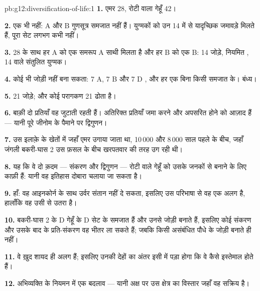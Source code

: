 \begin{solution}{pb:g12:diversification-of-life:1}
\textbf{1.} एमर 28, रोटी वाला गेहूँ 42।

\textbf{2.} एक भी नहीं: A और B गुणसूत्र समजात नहीं हैं। युग्मकों को उन 14
में से यादृच्छिक जमावड़े मिलते हैं, पूरा सेट लगभग कभी नहीं।

\textbf{3.} 28  के साथ हर A को एक समरूप A साथी मिलता है और हर B
को एक B: 14 जोड़े, नियमित , 14 वाले संतुलित युग्मक।

\textbf{4.} कोई भी जोड़ी नहीं बना सकता: 7 A, 7 B और 7 D , और हर एक
बिना किसी समजात के। बंध्य।

\textbf{5.} 21 जोड़े; और कोई परागकण 21 ढोता है।

\textbf{6.} बाक़ी दो प्रतियाँ वह  जुटाती रहती हैं। अतिरिक्त प्रतियाँ
 जमा करने और अपसरित होने को आज़ाद हैं --- यानी पूरे जीनोम के
पैमाने पर द्विगुणन।

\textbf{7.} उस इलाक़े के खेतों में जहाँ एमर उगाया जाता था, 10\,000 और
8\,000 साल पहले के बीच, जहाँ जंगली बकरी-घास 2 उस फ़सल के बीच खरपतवार की तरह
उग रही थी।

\textbf{8.} यह कि वे दो क़दम --- संकरण और द्विगुणन --- रोटी वाले गेहूँ को
उसके जनकों से बनाने के लिए काफ़ी हैं: यानी वह इतिहास दोबारा चलाया जा सकता
है।

\textbf{9.} हाँ: वह आइनकोर्न के साथ उर्वर संतान नहीं दे सकता, इसलिए उस
परिभाषा से वह एक अलग  है, हालाँकि वह उसी से उतरा है।

\textbf{10.} बकरी-घास 2 के D  गेहूँ के D सेट के समजात हैं और उनसे
जोड़ी बनाते हैं, इसलिए कोई संकरण और उसके बाद के प्रति-संकरण वह  भीतर ला
सकते हैं; जबकि किसी असंबंधित पौधे के  जोड़ी बनाते ही नहीं।

\textbf{11.} वे  ख़ुद शायद ही अलग हैं; इसलिए उनकी देहों का अंतर इसी में
पड़ा होगा कि वे  कैसे इस्तेमाल होते हैं।

\textbf{12.} अभिव्यक्ति के नियमन में एक बदलाव --- यानी अक्ष पर उस क्षेत्र
का विस्तार जहाँ वह  सक्रिय है।


\end{solution}
